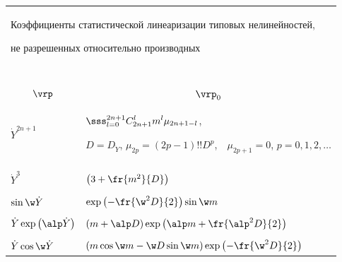 {\small



\begin{table}[b]\small

\vspace*{-6pt}

\begin{center}



\begin{tabular}{|p{35mm}|p{87mm}|}

\multicolumn{2}{p{126mm}}{Коэффициенты статистической линеаризации типовых нелинейностей, 

не разрешенных  относительно производных}\\

\multicolumn{2}{c}{\ }\\[-6pt]

\hline

\multicolumn{1}{|c|}{$\vrp$}&\multicolumn{1}{c|}{$\vrp_0$}\\

\hline

$\dot Y^{2n +1}$ &$\displaystyle\sss_{l=0}^{2n+1} C_{2n+1}^l m^l \mu_{2n +1-l}$, 

$D=D_{\dot Y}$, $\mu_{2p} = (2p-1)!! D^p$,\ \ $\mu_{2p+1} =0$, $p=0,1,2,\ldots $\\[3pt]

\hline

&\\[-8pt]

$\dot Y^{3} $&$  \left(3+\fr{m^2}{D} \right) $\\[8pt]

\hline

&\\[-8pt]

$\sin \w\dot Y$&$ \exp \left(-\fr{\w^2 D}{2}\right) \sin \w m$\\[8pt]

\hline

&\\[-8pt]

$\dot Y \exp \left(\alp \dot Y\right)$&

$(m+ \alp D) \exp\left(\alp m+ \fr{\alp^2 D}{2}\right)$\\[8pt]

\hline

&\\[-9pt]

$\dot Y \cos\w\dot Y$&$ 

(m\cos \w m - \w D \sin \w m) \exp \left(- \fr{\w^2 D}{2}\right)$\\[8pt]


\end{tabular}
\end{center}
\end{table}}
